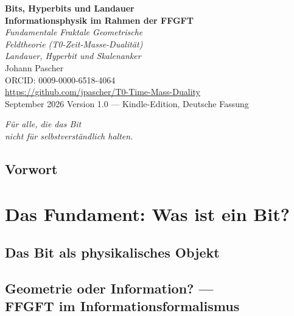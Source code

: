 \documentclass[11pt,twoside,openright]{book}
\theoremstyle{plain}
\theoremstyle{definition}
\begin{document}
\begin{titlepage}
\centering\vspace*{1.5cm}
{\Huge\bfseries\color{blue!70!black}
  Bits, Hyperbits und Landauer}\\[0.6cm]
{\Large\bfseries\color{blue!40!black}
  Informationsphysik im Rahmen der FFGFT}\\[1cm]
{\LARGE\itshape Fundamentale Fraktale Geometrische\\[0.2cm]
  Feldtheorie (T0-Zeit-Masse-Dualität)}\\[0.5cm]
{\large\itshape Landauer, Hyperbit und Skalenanker}\\[2cm]
{\large Johann Pascher}\\[0.3cm]
{\normalsize ORCID: 0009-0000-6518-4064}\\[0.3cm]
{\normalsize\url{https://github.com/jpascher/T0-Time-Mass-Duality}}\\[1.5cm]
{\normalsize September 2026}
\vfill{\small Version 1.0 --- Kindle-Edition, Deutsche Fassung}
\end{titlepage}

\thispagestyle{empty}
\vspace*{0.3\textheight}
\begin{center}
\itshape\large
Für alle, die das Bit\\
nicht für selbstverständlich halten.
\end{center}
\vfill

\tableofcontents

\chapter*{Vorwort}


\mainmatter

\part{Das Fundament: Was ist ein Bit?}

\chapter{Das Bit als physikalisches Objekt}


\chapter[Geometrie oder Information?]{Geometrie oder Information? ---\\
FFGFT im Informationsformalismus}

\end{document}
